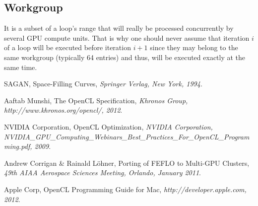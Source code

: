 \documentclass[a4paper,12pt]{article}
\begin{document}
\subsection{Workgroup}
It is a subset of a loop's range that will really be processed concurrently by several GPU compute units. That is why one should never assume that iteration $i$ of a loop will be executed before iteration $i+1$ since they may belong to the same workgroup (typically 64 entries) and thus, will be executed exactly at the same time.


%
%


\begin{thebibliography}{99}
\small

	SAGAN,
	Space-Filling Curves,
	\emph{Springer Verlag, New York, 1994}.

	Aaftab Munshi,
	The OpenCL Specification,
	\emph{Khronos Group, http://www.khronos.org/opencl/, 2012}.

	NVIDIA Corporation,
	OpenCL Optimization,
	\emph{NVIDIA Corporation, NVIDIA\_GPU\_Computing\_Webinars\_Best\_Practices\_For\_OpenCL\_Programming.pdf, 2009}.

	Andrew Corrigan \& Rainald Löhner,
	Porting of FEFLO to Multi-GPU Clusters,
	\emph{49th AIAA Aerospace Sciences Meeting, Orlando, January 2011}.

	Apple Corp,
	OpenCL Programming Guide for Mac,
	\emph{http://developer.apple.com, 2012}.



\end{thebibliography}
\end{document}
